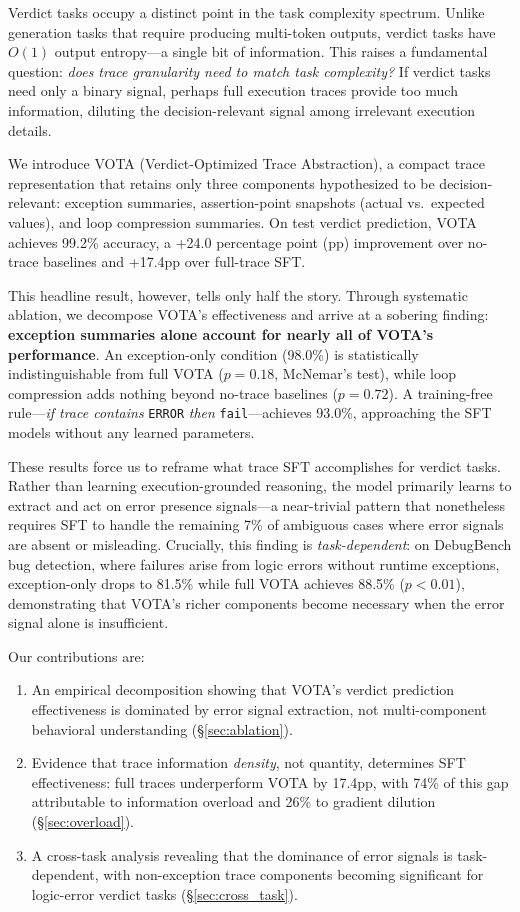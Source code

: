 \documentclass[11pt,a4paper]{article}
\begin{document}
Verdict tasks occupy a distinct point in the task complexity spectrum.
Unlike generation tasks that require producing multi-token outputs, verdict tasks have $O(1)$ output entropy---a single bit of information.
This raises a fundamental question: \emph{does trace granularity need to match task complexity?}
If verdict tasks need only a binary signal, perhaps full execution traces provide too much information, diluting the decision-relevant signal among irrelevant execution details.

We introduce VOTA (Verdict-Optimized Trace Abstraction), a compact trace representation that retains only three components hypothesized to be decision-relevant: exception summaries, assertion-point snapshots (actual vs.\ expected values), and loop compression summaries.
On test verdict prediction, VOTA achieves 99.2\% accuracy, a +24.0 percentage point (pp) improvement over no-trace baselines and +17.4pp over full-trace SFT.

This headline result, however, tells only half the story.
Through systematic ablation, we decompose VOTA's effectiveness and arrive at a sobering finding: \textbf{exception summaries alone account for nearly all of VOTA's performance}.
An exception-only condition (98.0\%) is statistically indistinguishable from full VOTA ($p=0.18$, McNemar's test), while loop compression adds nothing beyond no-trace baselines ($p=0.72$).
A training-free rule---\emph{if trace contains} \texttt{ERROR} \emph{then} \texttt{fail}---achieves 93.0\%, approaching the SFT models without any learned parameters.

These results force us to reframe what trace SFT accomplishes for verdict tasks.
Rather than learning execution-grounded reasoning, the model primarily learns to extract and act on error presence signals---a near-trivial pattern that nonetheless requires SFT to handle the remaining 7\% of ambiguous cases where error signals are absent or misleading.
Crucially, this finding is \emph{task-dependent}: on DebugBench bug detection, where failures arise from logic errors without runtime exceptions, exception-only drops to 81.5\% while full VOTA achieves 88.5\% ($p<0.01$), demonstrating that VOTA's richer components become necessary when the error signal alone is insufficient.

Our contributions are:
\begin{enumerate}
\item An empirical decomposition showing that VOTA's verdict prediction effectiveness is dominated by error signal extraction, not multi-component behavioral understanding (\S\ref{sec:ablation}).
\item Evidence that trace information \emph{density}, not quantity, determines SFT effectiveness: full traces underperform VOTA by 17.4pp, with 74\% of this gap attributable to information overload and 26\% to gradient dilution (\S\ref{sec:overload}).
\item A cross-task analysis revealing that the dominance of error signals is task-dependent, with non-exception trace components becoming significant for logic-error verdict tasks (\S\ref{sec:cross_task}).
\end{enumerate}
\end{document}
